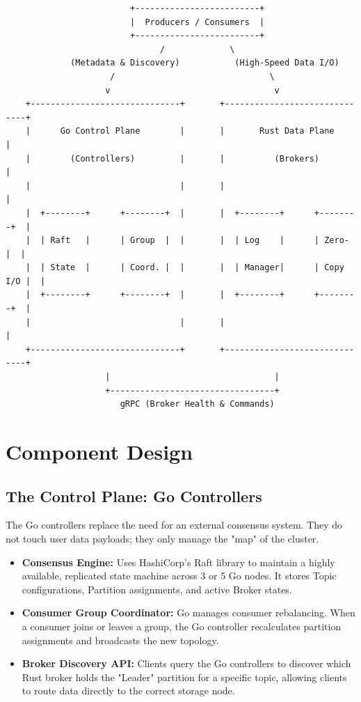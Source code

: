 \documentclass[11pt, a4paper]{article}
\begin{document}
\begin{verbatim}
                         +-------------------------+
                         |  Producers / Consumers  |
                         +-------------------------+
                               /             \
             (Metadata & Discovery)           (High-Speed Data I/O)
                     /                               \
                    v                                 v
    +------------------------------+       +------------------------------+
    |      Go Control Plane        |       |       Rust Data Plane        |
    |        (Controllers)         |       |          (Brokers)           |
    |                              |       |                              |
    |  +--------+      +--------+  |       |  +--------+      +--------+  |
    |  | Raft   |      | Group  |  |       |  | Log    |      | Zero-  |  |
    |  | State  |      | Coord. |  |       |  | Manager|      | Copy I/O |  |
    |  +--------+      +--------+  |       |  +--------+      +--------+  |
    |                              |       |                              |
    +------------------------------+       +------------------------------+
                    |                                 |
                    +---------------------------------+
                       gRPC (Broker Health & Commands)
\end{verbatim}

\section{Component Design}

\subsection{The Control Plane: Go Controllers}
The Go controllers replace the need for an external consensus system. They do not touch user data payloads; they only manage the "map" of the cluster.

\begin{itemize}
    \item \textbf{Consensus Engine:} Uses HashiCorp's Raft library to maintain a highly available, replicated state machine across 3 or 5 Go nodes. It stores Topic configurations, Partition assignments, and active Broker states.
    \item \textbf{Consumer Group Coordinator:} Go manages consumer rebalancing. When a consumer joins or leaves a group, the Go controller recalculates partition assignments and broadcasts the new topology.
    \item \textbf{Broker Discovery API:} Clients query the Go controllers to discover which Rust broker holds the "Leader" partition for a specific topic, allowing clients to route data directly to the correct storage node.
\end{itemize}
\end{document}
